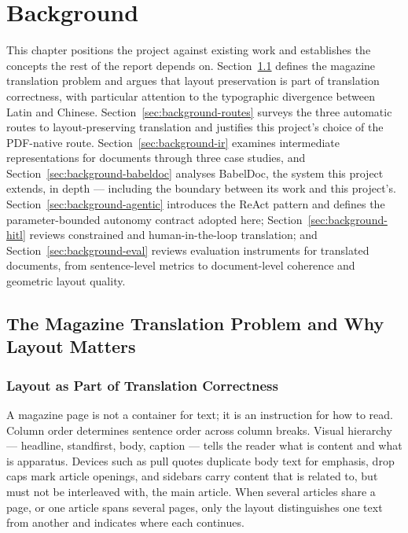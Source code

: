 \chapter{Background}
\label{chap:background}

This chapter positions the project against existing work and
establishes the concepts the rest of the report depends on.
Section~\ref{sec:background-problem} defines the magazine translation
problem and argues that layout preservation is part of translation
correctness, with particular attention to the typographic divergence
between Latin and Chinese. Section~\ref{sec:background-routes} surveys
the three automatic routes to layout-preserving translation and
justifies this project's choice of the PDF-native route.
Section~\ref{sec:background-ir} examines intermediate representations
for documents through three case studies, and
Section~\ref{sec:background-babeldoc} analyses BabelDoc, the system
this project extends, in depth --- including the boundary between its
work and this project's. Section~\ref{sec:background-agentic}
introduces the ReAct pattern and defines the parameter-bounded
autonomy contract adopted here;
Section~\ref{sec:background-hitl} reviews constrained and
human-in-the-loop translation; and
Section~\ref{sec:background-eval} reviews evaluation instruments for
translated documents, from sentence-level metrics to document-level
coherence and geometric layout quality.

\section{The Magazine Translation Problem and Why Layout Matters}
\label{sec:background-problem}

\subsection{Layout as Part of Translation Correctness}

A magazine page is not a container for text; it is an instruction for
how to read. Column order determines sentence order across column
breaks. Visual hierarchy --- headline, standfirst, body, caption ---
tells the reader what is content and what is apparatus. Devices such
as pull quotes duplicate body text for emphasis, drop caps mark article
openings, and sidebars carry content that is related to, but must not
be interleaved with, the main article. When several articles share a
page, or one article spans several pages, only the layout distinguishes
one text from another and indicates where each continues.

